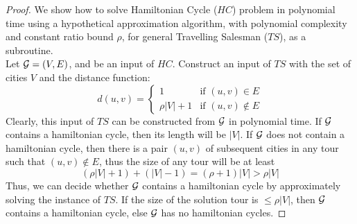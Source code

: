 \begin{proof}
    We show how to solve Hamiltonian Cycle ($HC$) problem
    in polynomial time using a hypothetical approximation algorithm,
    with polynomial complexity and constant ratio bound $\rho$,
    for general Travelling Salesman ($TS$), as a subroutine.\\

    Let $\mathcal{G} = (V, E)$, and be an input of $HC$.
    Construct an input of $TS$ with the set of cities $V$ and the distance function:
    $$ d(u,v)= \begin{cases}
                      1 & \text{if } (u, v) \in E \\
            \rho|V| + 1 & \text{if } (u, v) \not\in E
    \end{cases}
    $$
    Clearly, this input of $TS$ can be constructed from $\mathcal{G}$ in polynomial time.
    If $\mathcal{G}$ contains a hamiltonian cycle,
    then its length will be $|V|$.
    If $\mathcal{G}$ does not contain a hamiltonian cycle,
    then there is a pair $(u,v)$ of subsequent cities in any tour such that
    $(u, v) \not\in E$,
    thus the size of any tour will be at least
    $$(\rho|V| + 1) + (|V| − 1) = (\rho + 1)|V| > \rho|V|$$
    Thus, we can decide whether $\mathcal{G}$ contains a hamiltonian cycle
    by approximately solving the instance of $TS$.
    If the size of the solution tour is $\leq \rho|V|$,
    then $\mathcal{G}$ contains a hamiltonian cycle,
    else $\mathcal{G}$ has no hamiltonian cycles.
\end{proof}

